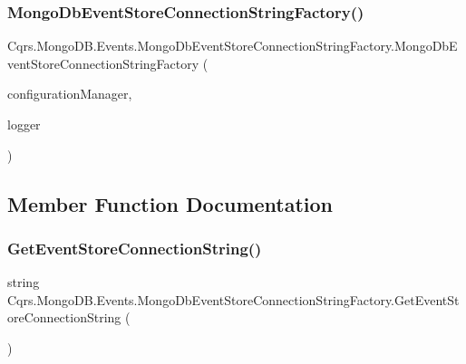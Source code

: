 \subsubsection{\texorpdfstring{Mongo\+Db\+Event\+Store\+Connection\+String\+Factory()}{MongoDbEventStoreConnectionStringFactory()}}
{\footnotesize\ttfamily Cqrs.\+Mongo\+D\+B.\+Events.\+Mongo\+Db\+Event\+Store\+Connection\+String\+Factory.\+Mongo\+Db\+Event\+Store\+Connection\+String\+Factory (\begin{DoxyParamCaption}\item[{\hyperlink{interfaceCqrs_1_1Configuration_1_1IConfigurationManager}{I\+Configuration\+Manager}}]{configuration\+Manager,  }\item[{I\+Logger}]{logger }\end{DoxyParamCaption})}



\subsection{Member Function Documentation}
\mbox{\label{classCqrs_1_1MongoDB_1_1Events_1_1MongoDbEventStoreConnectionStringFactory_af78f60c035678185ecd266019f42838b_af78f60c035678185ecd266019f42838b}} 
\subsubsection{\texorpdfstring{Get\+Event\+Store\+Connection\+String()}{GetEventStoreConnectionString()}}
{\footnotesize\ttfamily string Cqrs.\+Mongo\+D\+B.\+Events.\+Mongo\+Db\+Event\+Store\+Connection\+String\+Factory.\+Get\+Event\+Store\+Connection\+String (\begin{DoxyParamCaption}{ }\end{DoxyParamCaption})}



